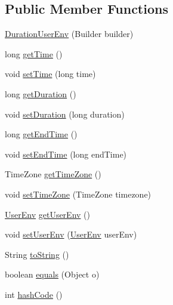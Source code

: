 \subsection*{\-Public \-Member \-Functions}
\begin{DoxyCompactItemize}
\item 
\hyperlink{classlab_1_1davidahn_1_1appshuttle_1_1collect_1_1env_1_1_duration_user_env_aeee4c3178b01ed84643b385f67c068c2}{\-Duration\-User\-Env} (\-Builder builder)
\item 
long \hyperlink{classlab_1_1davidahn_1_1appshuttle_1_1collect_1_1env_1_1_duration_user_env_a3f1d20dade84330873041688f89fac4d}{get\-Time} ()
\item 
void \hyperlink{classlab_1_1davidahn_1_1appshuttle_1_1collect_1_1env_1_1_duration_user_env_a1188a9bc35369018131f8cd74f4a5801}{set\-Time} (long time)
\item 
long \hyperlink{classlab_1_1davidahn_1_1appshuttle_1_1collect_1_1env_1_1_duration_user_env_ac40d1c250de946e8df3449610e02eddc}{get\-Duration} ()
\item 
void \hyperlink{classlab_1_1davidahn_1_1appshuttle_1_1collect_1_1env_1_1_duration_user_env_af2960929c45554bf53462f92e6d5736d}{set\-Duration} (long duration)
\item 
long \hyperlink{classlab_1_1davidahn_1_1appshuttle_1_1collect_1_1env_1_1_duration_user_env_a94ee488b1c3c93284fce5e66e2d4a182}{get\-End\-Time} ()
\item 
void \hyperlink{classlab_1_1davidahn_1_1appshuttle_1_1collect_1_1env_1_1_duration_user_env_a59a5f134514989990748f94bdfcff3e6}{set\-End\-Time} (long end\-Time)
\item 
\-Time\-Zone \hyperlink{classlab_1_1davidahn_1_1appshuttle_1_1collect_1_1env_1_1_duration_user_env_a582d9f254a84b36e4f4b2220e680997e}{get\-Time\-Zone} ()
\item 
void \hyperlink{classlab_1_1davidahn_1_1appshuttle_1_1collect_1_1env_1_1_duration_user_env_aa1a0072f8c309c690903c1ef32b7ad23}{set\-Time\-Zone} (\-Time\-Zone timezone)
\item 
\hyperlink{classlab_1_1davidahn_1_1appshuttle_1_1collect_1_1env_1_1_user_env}{\-User\-Env} \hyperlink{classlab_1_1davidahn_1_1appshuttle_1_1collect_1_1env_1_1_duration_user_env_aee70c2d81e885ed52032ad3872366f0a}{get\-User\-Env} ()
\item 
void \hyperlink{classlab_1_1davidahn_1_1appshuttle_1_1collect_1_1env_1_1_duration_user_env_a5440f880820717e60d2ac8a4074c10ff}{set\-User\-Env} (\hyperlink{classlab_1_1davidahn_1_1appshuttle_1_1collect_1_1env_1_1_user_env}{\-User\-Env} user\-Env)
\item 
\-String \hyperlink{classlab_1_1davidahn_1_1appshuttle_1_1collect_1_1env_1_1_duration_user_env_a3415bd8f816ec423ea9111bdc836cf63}{to\-String} ()
\item 
boolean \hyperlink{classlab_1_1davidahn_1_1appshuttle_1_1collect_1_1env_1_1_duration_user_env_a4b8f05055a1ab46dc47f82d2369a5009}{equals} (\-Object o)
\item 
int \hyperlink{classlab_1_1davidahn_1_1appshuttle_1_1collect_1_1env_1_1_duration_user_env_a76a4d95338fbe18023f7d323b0e2a9eb}{hash\-Code} ()
\end{DoxyCompactItemize}


